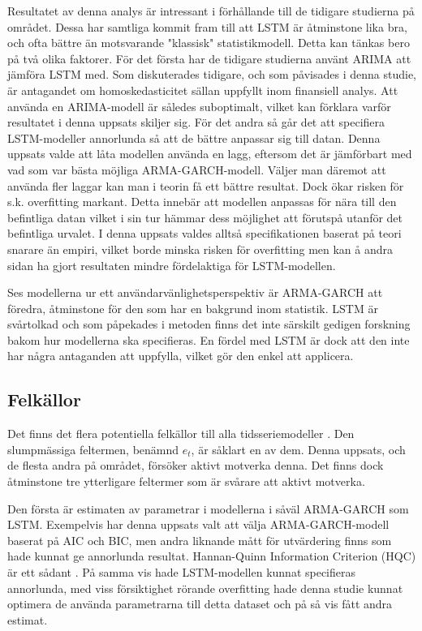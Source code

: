 \documentclass[12pt]{article}
\begin{document}
\par Resultatet av denna analys är intressant i förhållande till de tidigare studierna på området. Dessa har samtliga kommit fram till att LSTM är åtminstone lika bra, och ofta bättre än motsvarande "klassisk" statistikmodell. Detta kan tänkas bero på två olika faktorer. För det första har de tidigare studierna använt ARIMA att jämföra LSTM med. Som diskuterades tidigare, och som påvisades i denna studie, är antagandet om homoskedasticitet sällan uppfyllt inom finansiell analys. Att använda en ARIMA-modell är således suboptimalt, vilket kan förklara varför resultatet i denna uppsats skiljer sig. För det andra så går det att specifiera LSTM-modeller annorlunda så att de bättre anpassar sig till datan. Denna uppsats valde att låta modellen använda en lagg, eftersom det är jämförbart med vad som var bästa möjliga ARMA-GARCH-modell. Väljer man däremot att använda fler laggar kan man i teorin få ett bättre resultat. Dock ökar risken för s.k. overfitting markant. Detta innebär att modellen anpassas för nära till den befintliga datan vilket i sin tur hämmar dess möjlighet att förutspå utanför det befintliga urvalet. I denna uppsats valdes alltså specifikationen baserat på teori snarare än empiri, vilket borde minska risken för overfitting men kan å andra sidan ha gjort resultaten mindre fördelaktiga för LSTM-modellen. 

\par Ses modellerna ur ett användarvänlighetsperspektiv är ARMA-GARCH att föredra, åtminstone för den som har en bakgrund inom statistik. LSTM är svårtolkad och som påpekades i metoden finns det inte särskilt gedigen forskning bakom hur modellerna ska specifieras. En fördel med LSTM är dock att den inte har några antaganden att uppfylla, vilket gör den enkel att applicera. 

\subsection{Felkällor}
Det finns det flera potentiella felkällor till alla tidsseriemodeller \parencite{hyndman2018forecasting}. Den slumpmässiga feltermen, benämnd \(e_t\), är såklart en av dem. Denna uppsats, och de flesta andra på området, försöker aktivt motverka denna. Det finns dock åtminstone tre ytterligare feltermer som är svårare att aktivt motverka. 

Den första är estimaten av parametrar i modellerna i såväl ARMA-GARCH som LSTM. Exempelvis har denna uppsats valt att välja ARMA-GARCH-modell baserat på AIC och BIC, men andra liknande mått för utvärdering finns som hade kunnat ge annorlunda resultat. Hannan-Quinn Information Criterion (HQC) är ett sådant \parencite{hannan1979determination}. På samma vis hade LSTM-modellen kunnat specifieras annorlunda, med viss försiktighet rörande overfitting hade denna studie kunnat optimera de använda parametrarna till detta dataset och på så vis fått andra estimat.
\end{document}
